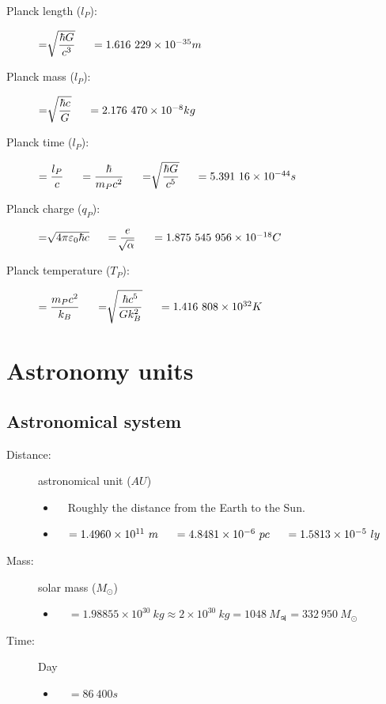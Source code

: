 \documentclass[]{report}
\newcommand \tab[1][1cm]{\hspace*{#1}}
\newcommand{\items}{\item\ \ }
\begin{document}
\begin{description}

\item[Planck length ($l_P$):] \( =\sqrt[]{\dfrac{\hbar G}{c^3}} \tab[0.5cm] = 1.616\ 229 \times 10^{-35} m\)

\item[Planck mass ($l_P$):] \( = \sqrt[]{\dfrac{\hbar c}{G}} \tab[0.5cm] = 2.176\ 470 \times 10^{-8} kg\)

\item[Planck time ($l_P$):] \( = \dfrac{l_P}{c} \tab[0.5cm] = \dfrac{\hbar}{m_P c^2} \tab[0.5cm] = \sqrt[]{\dfrac{\hbar G}{c^5}} \tab[0.5cm] = 5.391\ 16 \times 10^{-44} s\)

\item[Planck charge ($q_P$):] \( = \sqrt[]{4\pi\varepsilon_0\hbar c} \tab[0.5cm] = \dfrac{e}{\sqrt[]{\alpha}}\tab[0.5cm] = 1.875\ 545\ 956 \times 10^{-18} C\)

\item[Planck temperature ($T_P$):] \( = \dfrac{m_P c^2}{k_B} \tab[0.5cm] = \sqrt[]{\dfrac{\hbar c^5}{Gk_B^2}} \tab[0.5cm] = 1.416\ 808 \times 10^{32} K\)

\end{description}

            
\section{Astronomy units}


\subsection{Astronomical system}
\begin{description}

\item[Distance:] astronomical unit ($AU$)
\begin{itemize}
\items Roughly the distance from the Earth to the Sun.
\items $= 1.4960 \times 10^{11}\ m \tab[0.5cm]= 4.8481 \times 10^{-6}\ pc \tab[0.5cm]= 1.5813 \times 10^{-5}\ ly$
\end{itemize}

\item[Mass:] solar mass ($M_\odot$)
\begin{itemize}
\items $= 1.98855 \times 10^{30}\ kg\approx 2 \times 10^{30}\ kg = 1048\ M_{\jupiter} = 332\ 950\ M_\odot$
\end{itemize}

\item[Time:] Day
\begin{itemize}
\items $= 86\ 400 s$
\end{itemize}
\end{description}
\end{document}
